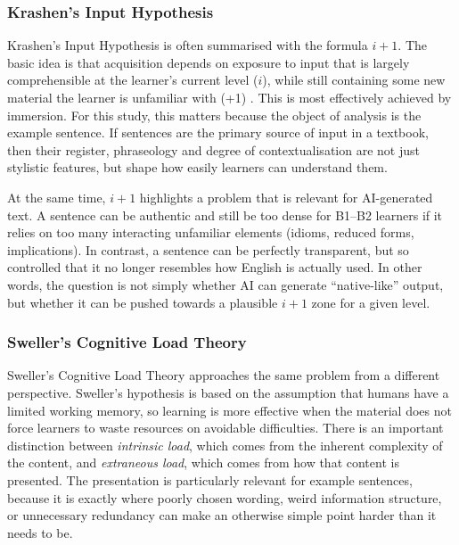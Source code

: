 \subsubsection{Krashen's Input Hypothesis}

Krashen's Input Hypothesis is often summarised with the formula $i+1$. The basic idea is that acquisition depends on exposure to input that is largely comprehensible at the learner's current level ($i$), while still containing some new material the learner is unfamiliar with (+1) \parencite{krashenInputHypothesisIssues1985}. This is most effectively achieved by immersion. For this study, this matters because the object of analysis is the example sentence. If sentences are the primary source of input in a textbook, then their register, phraseology and degree of contextualisation are not just stylistic features, but shape how easily learners can understand them.

At the same time, $i+1$ highlights a problem that is relevant for AI-generated text. A sentence can be authentic and still be too dense for B1--B2 learners if it relies on too many interacting unfamiliar elements (idioms, reduced forms, implications). In contrast, a sentence can be perfectly transparent, but so controlled that it no longer resembles how English is actually used. In other words, the question is not simply whether AI can generate ``native-like'' output, but whether it can be pushed towards a plausible $i+1$ zone for a given level.

\subsubsection{Sweller's Cognitive Load Theory}

Sweller's Cognitive Load Theory \parencite*{swellerCognitiveLoadProblem1988a} approaches the same problem from a different perspective. Sweller's hypothesis is based on the assumption that humans have a limited working memory, so learning is more effective when the material does not force learners to waste resources on avoidable difficulties. There is an important distinction between \textit{intrinsic load}, which comes from the inherent complexity of the content, and \textit{extraneous load}, which comes from how that content is presented. The presentation is particularly relevant for example sentences, because it is exactly where poorly chosen wording, weird information structure, or unnecessary redundancy can make an otherwise simple point harder than it needs to be.

